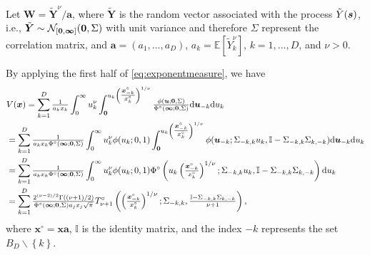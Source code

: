 \documentclass[12pt]{article}
\begin{document}
Let $\bm W= \tilde{\bm Y}^{\nu} / \bm a$, where $\tilde{\bm Y}$ is the random vector associated with the process $\tilde{Y}({\boldsymbol{s}})$, i.e., $\tilde{\bm Y} \sim {\mathcal N}_{\left[ \bm 0, \bm \infty\right]}(\bm 0, \Sigma)$ with unit variance and therefore $\Sigma$ represent the correlation matrix, and $\bm a = (a_1, \ldots, a_D)$, $a_k=\mathbb E[\tilde Y_k^\nu]$, $k=1, \ldots, D$, and $\nu>0$.

By applying the first half of \eqref{eq:exponentmeasure}, we have 
\begin{align}
& V(\bm x) = \sum_{k=1}^D{\textstyle{1\over a_kx_k}}\int_0^\infty u_k^\nu \int_{\bm 0}^{u_k \left({\textstyle{\bm x_{-k}^\circ\over x_{k}^\circ}}\right)^{1/\nu}} {\textstyle{\phi(\bm u;\bm 0, \Sigma)\over\Phi^\circ(\bm \infty;\bm 0, \Sigma)}}\text d \bm u_{-k}\text d u_k \nonumber \\ 
&=\sum_{k=1}^D{\textstyle{1\over a_k x_k \Phi^\circ(\bm \infty;\bm 0, \Sigma)}}\int_0^\infty u_k^\nu \phi(u_k;0, 1) \int_{\bm 0}^{u_k\left({\textstyle{\bm x_{-k}^\circ\over x_k^\circ}}\right)^{1/\nu}}\phi(\bm u_{-k}; \Sigma_{-k,k}u_k, \mathbb{I}-\Sigma_{-k,k}\Sigma_{k,-k})\text d \bm u_{-k}\text d u_k \nonumber \\ 
&=\sum_{k=1}^D{\textstyle{1\over a_kx_k \Phi^\circ(\bm \infty;\bm 0, \Sigma)}}\int_0^\infty u_k^\nu \phi(u_k; 0, 1) \Phi^\circ\left(u_k\left({\textstyle{\bm x_{-k}^\circ\over x_k^\circ}}\right)^{1/\nu};\Sigma_{-k,k}u_k,\mathbb{I} -\Sigma_{-k,k}\Sigma_{k,-k}\right)\text d u_k \nonumber \\  
&=\sum_{k=1}^D {\textstyle{2^{(\nu-2)/2} \Gamma((\nu+1)/2)\over\Phi^\circ(\bm \infty;\bm 0, \Sigma) a_jx_j \sqrt{\pi}}} T_{\nu+1}^\circ\left(\left({\textstyle{\bm x_{-k}^\circ\over x_k^\circ}}\right)^{1/\nu};\Sigma_{-k,k},{\textstyle{\mathbb{I}-\Sigma_{-k,k}\Sigma_{k,-k}\over\nu+1}}\right)
\label{eq:truncated_extremal_t_V},
\end{align}
where $\bm x^\circ = \bm x \bm a$, $\mathbb{I}$ is the identity matrix, and the index $-k$ represents the set $B_D \backslash \left\{ k\right\}$.
\end{document}
